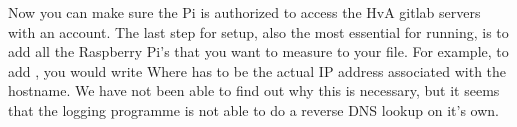 Now you can make sure the Pi is authorized to access the HvA gitlab servers with an account.
\newline
The last step for setup, also the most essential for running, is to add all the Raspberry Pi's that you want to measure to your  file. For example, to add , you would write\newline
{}\newline
Where  has to be the actual IP address associated with the hostname. We have not been able to find out why this is necessary, but it seems that the logging programme is not able to do a reverse DNS lookup on it's own.